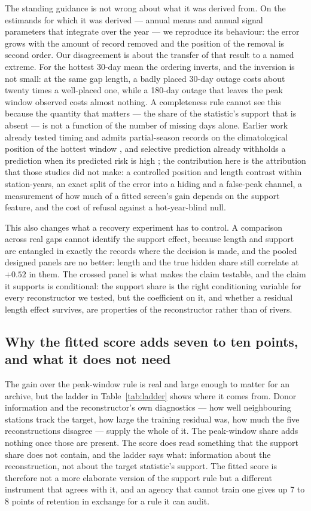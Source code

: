 \documentclass[draft]{agujournal2025}
\begin{document}
The standing guidance is not wrong about what it was derived from. On the
estimands for which it was derived --- annual means and annual signal parameters
that integrate over the year --- we reproduce its behaviour: the error grows with
the amount of record removed and the position of the removal is second order. Our
disagreement is about the transfer of that result to a named extreme. For the
hottest 30-day mean the ordering inverts, and the inversion is not small: at the
same gap length, a badly placed 30-day outage costs about twenty times a
well-placed one, while a 180-day outage that leaves the peak window observed costs
almost nothing. A completeness rule cannot see this because the quantity that
matters --- the share of the statistic's support that is absent --- is not a
function of the number of missing days alone. Earlier work already tested timing
\cite{johnson2021} and admits partial-season records on the climatological
position of the hottest window \cite{beaufort2022}, and selective prediction
already withholds a prediction when its predicted risk is high
\cite{geifman2017,zaoui2020}; the contribution here is the attribution that
those studies did not make: a controlled position and length contrast within
station-years, an exact split of the error into a hiding and a false-peak
channel, a measurement of how much of a fitted screen's gain depends on the
support feature, and the cost of refusal against a hot-year-blind null.

This also changes what a recovery experiment has to control. A comparison across
real gaps cannot identify the support effect, because length and support are
entangled in exactly the records where the decision is made, and the pooled
designed panels are no better: length and the true hidden share still correlate
at $+0.52$ in them. The crossed panel is what makes the claim testable, and the
claim it supports is conditional: the support share is the right conditioning
variable for every reconstructor we tested, but the coefficient on it, and whether
a residual length effect survives, are properties of the reconstructor rather than
of rivers.

\subsection{Why the fitted score adds seven to ten points, and what it does not need}

The gain over the peak-window rule is real and large enough to matter for an
archive, but the ladder in Table~\ref{tab:ladder} shows where it comes from.
Donor information and the reconstructor's own diagnostics --- how well
neighbouring stations track the target, how large the training residual was, how
much the five reconstructions disagree --- supply the whole of it. The
peak-window share adds nothing once those are present. The score does read something that the
support share does not contain, and the ladder says what: information about the
reconstruction, not about the target statistic's support. The fitted score is
therefore not a more elaborate version of the support rule but a different
instrument that agrees with it, and an agency that cannot train one gives up 7 to
8 points of retention in exchange for a rule it can audit.
\end{document}
